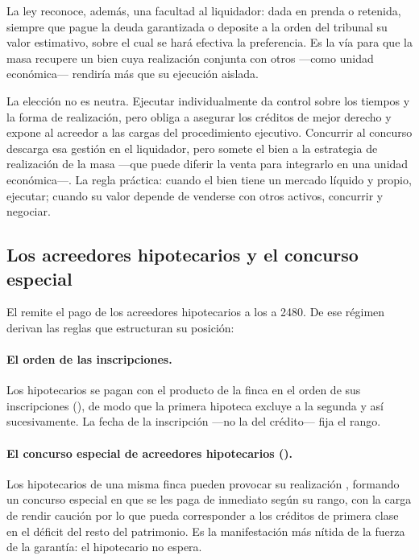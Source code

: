 La ley reconoce, además, una facultad al liquidador:  dada en
prenda o retenida, siempre que pague la deuda garantizada o deposite a la orden del tribunal su valor
estimativo, sobre el cual se hará efectiva la preferencia. Es la vía para que la masa recupere un
bien cuya realización conjunta con otros ---como unidad económica--- rendiría más que su ejecución
aislada.

\begin{practica}
La elección no es neutra. Ejecutar individualmente da control sobre los tiempos y la forma de
realización, pero obliga a asegurar los créditos de mejor derecho y expone al acreedor a las cargas
del procedimiento ejecutivo. Concurrir al concurso descarga esa gestión en el liquidador, pero
somete el bien a la estrategia de realización de la masa ---que puede diferir la venta para
integrarlo en una unidad económica---. La regla práctica: cuando el bien tiene un mercado líquido y
propio, ejecutar; cuando su valor depende de venderse con otros activos, concurrir y negociar.
\end{practica}

\subsection{Los acreedores hipotecarios y el concurso especial}

El  remite el pago de los acreedores hipotecarios a los  a 2480. De ese
régimen derivan las reglas que estructuran su posición:

\paragraph{El orden de las inscripciones.} Los hipotecarios se pagan con el producto de la finca en
el orden de sus inscripciones (), de modo que la primera hipoteca excluye a la segunda y
así sucesivamente. La fecha de la inscripción ---no la del crédito--- fija el rango.

\paragraph{El concurso especial de acreedores hipotecarios ().} Los hipotecarios de una
misma finca pueden provocar su realización , formando un concurso especial en que se les paga de inmediato según su rango, con la carga
de rendir caución por lo que pueda corresponder a los créditos de primera clase en el déficit del
resto del patrimonio. Es la manifestación más nítida de la fuerza de la garantía: el hipotecario no
espera.

